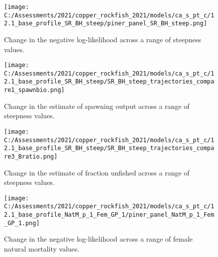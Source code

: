 \documentclass[11pt,
  english,
  a4paper,
]{article}
\begin{document}
\tagmcend\tagstructend


\begin{figure}
\centering
\texttt{[image: C:/Assessments/2021/copper\_rockfish\_2021/models/ca\_s\_pt\_c/12.1\_base\_profile\_SR\_BH\_steep/piner\_panel\_SR\_BH\_steep.png]}
\caption{Change in the negative log-likelihood across a range of steepness values.\label{fig:h-profile}}
\end{figure}

\tagmcend\tagstructend


\begin{figure}
\centering
\texttt{[image: C:/Assessments/2021/copper\_rockfish\_2021/models/ca\_s\_pt\_c/12.1\_base\_profile\_SR\_BH\_steep/SR\_BH\_steep\_trajectories\_compare1\_spawnbio.png]}
\caption{Change in the estimate of spawning output across a range of steepness values.\label{fig:h-ssb}}
\end{figure}

\tagmcend\tagstructend


\begin{figure}
\centering
\texttt{[image: C:/Assessments/2021/copper\_rockfish\_2021/models/ca\_s\_pt\_c/12.1\_base\_profile\_SR\_BH\_steep/SR\_BH\_steep\_trajectories\_compare3\_Bratio.png]}
\caption{Change in the estimate of fraction unfished across a range of steepness values.\label{fig:h-depl}}
\end{figure}

\tagmcend\tagstructend


\begin{figure}
\centering
\texttt{[image: C:/Assessments/2021/copper\_rockfish\_2021/models/ca\_s\_pt\_c/12.1\_base\_profile\_NatM\_p\_1\_Fem\_GP\_1/piner\_panel\_NatM\_p\_1\_Fem\_GP\_1.png]}
\caption{Change in the negative log-likelihood across a range of female natural mortality values.\label{fig:m-profile}}
\end{figure}

\tagmcend\tagstructend

\end{document}
